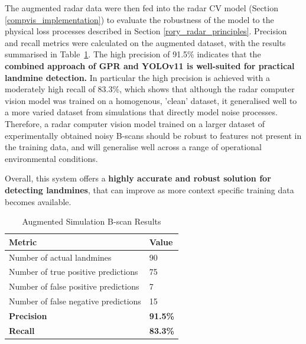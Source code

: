         The augmented radar data were then fed into the radar CV model (Section \ref{compvis_implementation}) to evaluate the robustness of the model to the physical loss processes described in Section \ref{rory_radar_principles}. Precision and recall metrics were calculated on the augmented dataset, with the results summarised in Table~\ref{tab:cv_results}. The high precision of 91.5\% indicates that the \textbf{combined approach of GPR and YOLOv11 is well-suited for practical landmine detection.} In particular the high precision is achieved with a moderately high recall of 83.3\%, which shows that although the radar computer vision model was trained on a homogenous, 'clean' dataset, it generalised well to a more varied dataset from simulations that directly model noise processes. Therefore, a radar computer vision model trained on a larger dataset of experimentally obtained noisy B-scans should be robust to features not present in the training data, and will generalise well across a range of operational environmental conditions.

        Overall, this system offers a \textbf{highly accurate and robust solution for detecting landmines}, that can improve as more context specific training data becomes available.

        \begin{table}[htbp]
          \centering

          \begin{tabular}{@{} l l @{}} 
            \toprule
            \textbf{Metric} & \textbf{Value} \\
            \midrule
            Number of actual landmines & 90 \\
            Number of true positive predictions & 75 \\
            Number of false positive predictions & 7 \\
            Number of false negative predictions &  15\\
            \midrule
            \textbf{Precision} &  \textbf{91.5\%}\\
            \textbf{Recall} & \textbf{83.3\%}\\
            \bottomrule
          \end{tabular}
            \caption{Augmented Simulation B-scan Results}
            \label{tab:cv_results}
        \end{table}       
        